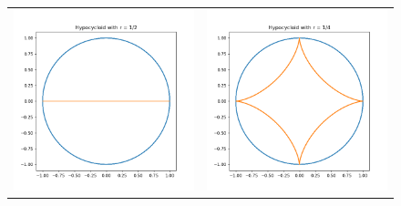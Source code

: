 \documentclass[a4paper]{article}
\begin{document}
\begin{figure}[h]
	\centering
	\begin{tabular}{cc}
		\includegraphics[scale=0.4]{Q3a-1} & \includegraphics[scale=0.4]{Q3a-2}\\

\end{tabular}
\end{figure}
\end{document}
